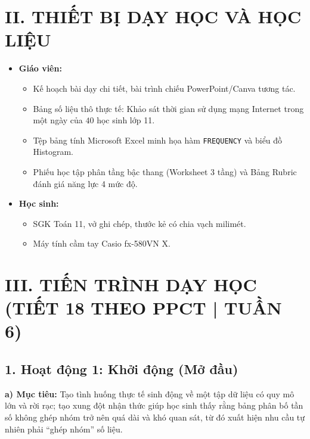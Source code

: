 \documentclass[12pt, a4paper]{article}
\begin{document}
\section*{II. THIẾT BỊ DẠY HỌC VÀ HỌC LIỆU}

\begin{itemize}[leftmargin=1.2cm]
    \item \textbf{Giáo viên:}
    \begin{itemize}[leftmargin=0.6cm]
        \item Kế hoạch bài dạy chi tiết, bài trình chiếu PowerPoint/Canva tương tác.
        \item Bảng số liệu thô thực tế: Khảo sát thời gian sử dụng mạng Internet trong một ngày của $40$ học sinh lớp 11.
        \item Tệp bảng tính Microsoft Excel minh họa hàm \texttt{FREQUENCY} và biểu đồ Histogram.
        \item Phiếu học tập phân tầng bậc thang (Worksheet 3 tầng) và Bảng Rubric đánh giá năng lực 4 mức độ.
    \end{itemize}
    \item \textbf{Học sinh:}
    \begin{itemize}[leftmargin=0.6cm]
        \item SGK Toán 11, vở ghi chép, thước kẻ có chia vạch milimét.
        \item Máy tính cầm tay Casio fx-580VN X.
    \end{itemize}
\end{itemize}

\section*{III. TIẾN TRÌNH DẠY HỌC (TIẾT 18 THEO PPCT | TUẦN 6)}

\subsection*{1. Hoạt động 1: Khởi động (Mở đầu)}

\noindent \textbf{a) Mục tiêu:}
Tạo tình huống thực tế sinh động về một tập dữ liệu có quy mô lớn và rời rạc; tạo xung đột nhận thức giúp học sinh thấy rằng bảng phân bố tần số không ghép nhóm trở nên quá dài và khó quan sát, từ đó xuất hiện nhu cầu tự nhiên phải ``ghép nhóm'' số liệu.
\end{document}
